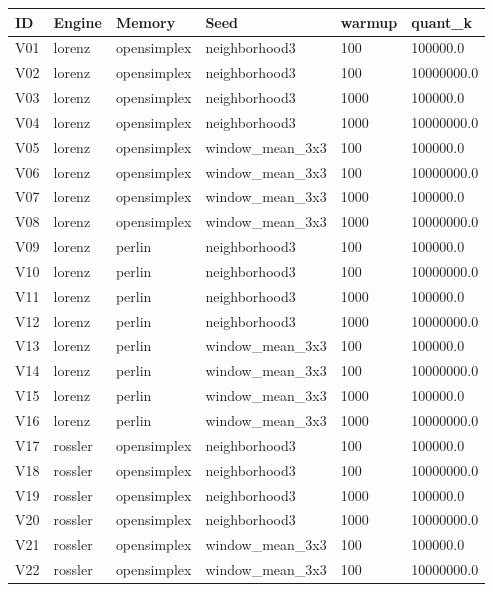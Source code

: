 \begin{table}[htbp]
  \centering
  \small
  \begin{tabular}{llllll}
    \hline
    ID & Engine & Memory & Seed & warmup & quant\_k \\
    \hline
    V01 & lorenz & opensimplex & neighborhood3 & 100 & 100000.0 \\
    V02 & lorenz & opensimplex & neighborhood3 & 100 & 10000000.0 \\
    V03 & lorenz & opensimplex & neighborhood3 & 1000 & 100000.0 \\
    V04 & lorenz & opensimplex & neighborhood3 & 1000 & 10000000.0 \\
    V05 & lorenz & opensimplex & window_mean_3x3 & 100 & 100000.0 \\
    V06 & lorenz & opensimplex & window_mean_3x3 & 100 & 10000000.0 \\
    V07 & lorenz & opensimplex & window_mean_3x3 & 1000 & 100000.0 \\
    V08 & lorenz & opensimplex & window_mean_3x3 & 1000 & 10000000.0 \\
    V09 & lorenz & perlin & neighborhood3 & 100 & 100000.0 \\
    V10 & lorenz & perlin & neighborhood3 & 100 & 10000000.0 \\
    V11 & lorenz & perlin & neighborhood3 & 1000 & 100000.0 \\
    V12 & lorenz & perlin & neighborhood3 & 1000 & 10000000.0 \\
    V13 & lorenz & perlin & window_mean_3x3 & 100 & 100000.0 \\
    V14 & lorenz & perlin & window_mean_3x3 & 100 & 10000000.0 \\
    V15 & lorenz & perlin & window_mean_3x3 & 1000 & 100000.0 \\
    V16 & lorenz & perlin & window_mean_3x3 & 1000 & 10000000.0 \\
    V17 & rossler & opensimplex & neighborhood3 & 100 & 100000.0 \\
    V18 & rossler & opensimplex & neighborhood3 & 100 & 10000000.0 \\
    V19 & rossler & opensimplex & neighborhood3 & 1000 & 100000.0 \\
    V20 & rossler & opensimplex & neighborhood3 & 1000 & 10000000.0 \\
    V21 & rossler & opensimplex & window_mean_3x3 & 100 & 100000.0 \\
    V22 & rossler & opensimplex & window_mean_3x3 & 100 & 10000000.0 \\

\end{tabular}
\end{table}
